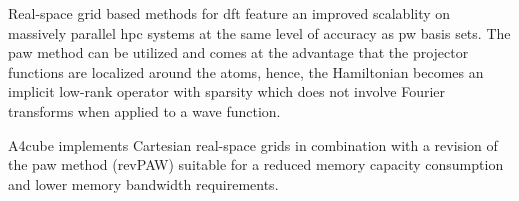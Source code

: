 \documentclass[oribibl]{llncs}
\newcommand{\codename}{A4cube}
\begin{document}
Real-space grid based methods for \ac{dft}
feature an improved scalablity on massively parallel \ac{hpc} systems at the same level of accuracy as \ac{pw} basis sets. 
The \ac{paw} method can be utilized and comes at the advantage that the projector functions are localized around the atoms, hence, the Hamiltonian becomes an implicit low-rank operator with sparsity which does not involve Fourier transforms when applied to a wave function.


\codename{} implements Cartesian real-space grids 
in combination with a revision of the \ac{paw} method (revPAW) suitable for
a reduced memory capacity consumption and lower memory bandwidth requirements.


 
\end{document}
